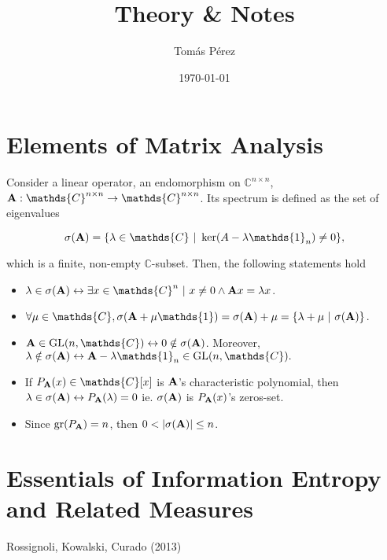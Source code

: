 \documentclass{homework}
\author{Tomás Pérez}
\date{\today}
\title{Theory \& Notes}
\begin{document}
 \maketitle

\section{Elements of Matrix Analysis}

Consider a linear operator, an endomorphism on $\mathds{C}^{n \times n}$, ${\bf A}: \mathds{C}^{n \times n} \rightarrow \mathds{C}^{n \times n}$. Its spectrum is defined as the set of eigenvalues 

$$
  \sigma({\bf A}) = \{\lambda \in \mathds{C} \blanky | \blanky \ker(A - \lambda \mathds{1}_n) \neq {0}\}, 
$$

which is a finite, non-empty $\mathds{C}$-subset. Then, the following statements hold

\begin{itemize}
    \item $\lambda \in \sigma({\bf A}) \leftrightarrow \exists x \in \mathds{C}^n \blanky | \blanky x \neq 0 \land {\bf A}x = \lambda x$.
    \item $\forall \mu \in \mathds{C}, \sigma({\bf A}+\mu \mathds{1}) = \sigma({\bf A}) + \mu = \{\lambda + \mu \blanky | \blanky \sigma({\bf A})\}$.
    \item ${\bf A} \in \textnormal{GL}(n, \mathds{C}) \leftrightarrow 0 \notin \sigma({\bf A})$. Moreover, $\lambda \notin \sigma({\bf A}) \leftrightarrow {\bf A}-\lambda \mathds{1}_n \in \textnormal{GL}(n, \mathds{C}).$
    \item If $P_{{\bf A}}(x) \in \mathds{C}[x]$ is ${\bf A}$'s characteristic polynomial, then $\lambda \in \sigma({\bf A}) \leftrightarrow P_{{\bf A}}(\lambda) = 0$ ie. $\sigma({\bf A})$ is $P_{\bf A}(x)$'s zeros-set. 
    \item Since $\textnormal{gr}(P_{{\bf A}})=n$, then $0 < |\sigma({\bf A})| \leq n$. 
\end{itemize}



\clearpage

\section{Essentials of Information Entropy and Related Measures}

Rossignoli, Kowalski, Curado (2013) \\
\end{document}

